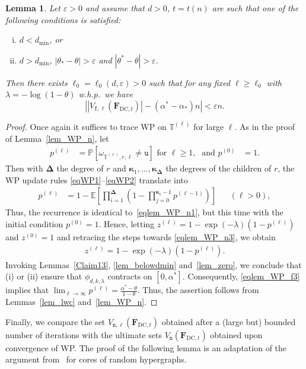 \documentclass[10pt,reqno]{amsart}
\numberwithin{equation}{section}
\renewcommand{\vec}[1]{\boldsymbol{#1}}
\newcommand\dmin{d_{\mathrm{min}}}
\newcommand{\FDC}[1]{\PHI_{\mathrm{DC},{#1}}}
\newcommand{\frozen}{\mathtt{f}}
\newcommand{\unfrozen}{\mathtt{u}}
\newcommand{\nll}{\mathtt{n}}
\newcommand{\fzn}{\frozen}
\newcommand{\uzn}{\unfrozen}
\newcommand{\TT}{\mathbb T}
\newcommand\PHI{\vec F}
\newcommand\eps{\varepsilon}
\newcommand\Erw{\mathbb{E}}
\newcommand\ex{\Erw}
\newcommand\bc[1]{\left({#1}\right)}
\newcommand\brk[1]{\left\lbrack{#1}\right\rbrack}
\newcommand\abs[1]{\left|{#1}\right|}
\newcommand{\whp}{w.h.p.}
\newcommand\pr{\mathbb{P}}
\newcommand\Lem{Lemma}
\newtheorem{lemma}[definition]{Lemma}
\def\pr{{\mathbb P}}
\newcommand{\ph}{\phi_{d,k,\lambda}}
\begin{document}
\begin{lemma}\label{lem_WP_f}
	Let $\eps>0$ and assume that $d>0$, $t=t(n)$ are such that one of the following conditions is satisfied:
	\begin{enumerate}[(i)]
		\item $d<\dmin$, or
		\item $d>\dmin$, $|\theta_*-\theta|>\eps$ and $|\theta^*-\theta|>\eps$.
	\end{enumerate}
	Then there exists $\ell_0=\ell_0(d,\eps)>0$ such that for any fixed $\ell\geq\ell_0$ with $\lambda=-\log(1-\theta)$ \whp\ we have 
	$$
	\abs{|V_{\fzn,\ell}(\FDC{t})|-(\alpha^*-\alpha_*)n}<\eps n.
	$$
\end{lemma}
\begin{proof}
	Once again it suffices to trace WP on $\TT^{(\ell)}$ for large $\ell$.
	As in the proof of \Lem~\ref{lem_WP_n}, let
	\begin{align}\label{eqlem_WP_f00}
	p^{(\ell)}&=\pr\brk{\omega_{\TT^{(\ell)},r,\ell}\neq\uzn}\mbox{ for $\ell\geq1$,}&\mbox{and }p^{(0)}&=1. 
	\end{align}
	Then with $\vec\Delta$ the degree of $r$ and $\vec\kappa_1,\ldots,\vec\kappa_{\vec\Delta}$ the degrees of the children of $r$, the WP update rules \eqref{eqWP1}--\eqref{eqWP2} translate into
	\begin{align}\label{eqlem_WP_f0}
		p^{(\ell)}&=1-\ex\brk{\prod_{i=1}^{\vec\Delta}\bc{1-\prod_{j=0}^{\vec\kappa_i-1}p^{(\ell-1)}}}&&(\ell>0),
	\end{align}
	Thus, the recurrence is identical to~\eqref{eqlem_WP_n1}, but this time with the initial condition $p^{(0)}=1$.
	Hence, letting $z^{(\ell)}=1-\exp(-\lambda)(1-p^{(\ell)})$ and $z^{(0)}=1$ and retracing the steps towards \eqref{eqlem_WP_n3}, we obtain
	\begin{align}
		z^{(\ell)}=1-\exp(-\lambda)(1-p^{(\ell)}).\label{eqlem_WP_f3}
	\end{align}
	Invoking \Lem s~\ref{Claim13}, \ref{lem_belowdmin} and~\ref{lem_zero}, we conclude that (i) or (ii) ensure that $\ph$ contracts on $[0,\alpha^*]$.
	Consequently, \eqref{eqlem_WP_f3} implies that $\lim_{\ell\to\infty}p^{(\ell)}=\frac{\alpha^*-\theta}{1-\theta}$.
	Thus, the assertion follows from \Lem s~\ref{lem_lwc} and~\ref{lem_WP_n}.
\end{proof}

Finally, we compare the set $V_{\nll,\ell}(\FDC{t})$ obtained after a (large but) bounded number of iterations with the ultimate sets $V_{\nll}(\FDC{t})$ obtained upon convergence of WP.
The proof of the following lemma is an adaptation of the argument from~\cite{Molloy} for cores of random hypergraphs.
\end{document}
